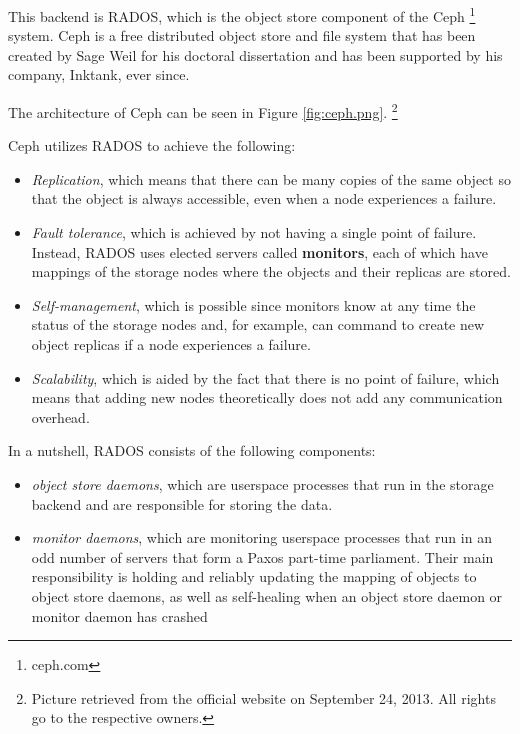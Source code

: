 This backend is RADOS\cite{rados}, which is the object store component of the 
Ceph \footnote{ceph.com} system. Ceph is a free distributed object store and 
file system that has been created by Sage Weil for his doctoral dissertation
\cite{weil-thesis} and has been supported by his company, Inktank, ever since.

The architecture of Ceph can be seen in Figure \ref{fig:ceph.png}.
\footnote{Picture retrieved from the official website on September 24, 2013.  
	All rights go to the respective owners.}


Ceph utilizes RADOS to achieve the following:

\begin{itemize}
	\item \textit{Replication}, which means that there can be many copies 
		of the same object so that the object is always accessible, 
		even when a node experiences a failure.
	\item \textit{Fault tolerance}, which is achieved by not having a 
		single point of failure. Instead, RADOS uses elected servers 
		called \textbf{monitors}, each of which have mappings of the 
		storage nodes where the objects and their replicas are stored.  
	\item \textit{Self-management}, which is possible since monitors know 
		at any time the status of the storage nodes and, for example, 
		can command to create new object replicas if a node experiences 
		a failure.
	\item \textit{Scalability}, which is aided by the fact that there is no 
		point of failure, which means that adding new nodes 
		theoretically does not add any communication overhead.
\end{itemize}

In a nutshell, RADOS consists of the following components:

\begin{itemize}
	\item \textit{object store daemons}, which are userspace processes that run 
		in the storage backend and are responsible for storing the data.
	\item \textit{monitor daemons}, which are monitoring userspace processes 
		that run in an odd number of servers that form a Paxos part-time 
		parliament\cite{Paxos}. Their main responsibility is holding and 
		reliably updating the mapping of objects to object store daemons, as 
		well as self-healing when an object store daemon or monitor daemon has 
		crashed
\end{itemize}

